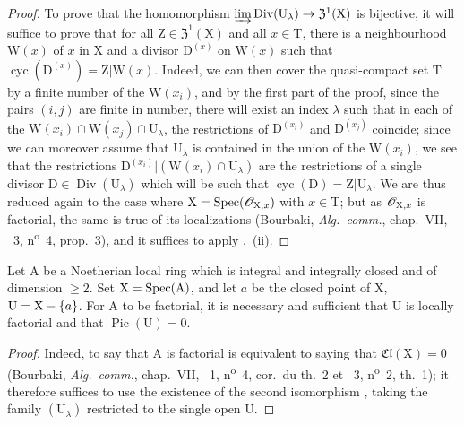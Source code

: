 \begin{proof}
To prove that the homomorphism $\varinjlim\operatorname{Div}(\mathrm{U}_\lambda)\to\mathfrak{Z}^1(\mathrm{X})$ is bijective, it will suffice to prove that for all $\mathrm{Z}\in\mathfrak{Z}^1(\mathrm{X})$ and all $x\in\mathrm{T}$, there is a neighbourhood $\mathrm{W}(x)$ of $x$ in $\mathrm{X}$ and a divisor $\mathrm{D}^{(x)}$ on $\mathrm{W}(x)$ such that $\operatorname{cyc}(\mathrm{D}^{(x)})=\mathrm{Z}|\mathrm{W}(x)$.
Indeed, we can then cover the quasi-compact set $\mathrm{T}$ by a finite number of the $\mathrm{W}(x_i)$, and by the first part of the proof, since the pairs $(i,j)$ are finite in number, there will exist an index $\lambda$ such that in each of the $\mathrm{W}(x_i)\cap\mathrm{W}(x_j)\cap\mathrm{U}_\lambda$, the restrictions of $\mathrm{D}^{(x_i)}$ and $\mathrm{D}^{(x_j)}$ coincide;
since we can moreover assume that $\mathrm{U}_\lambda$ is contained in the union of the $\mathrm{W}(x_i)$, we see that the restrictions $\mathrm{D}^{(x_i)}|(\mathrm{W}(x_i)\cap\mathrm{U}_\lambda)$ are the restrictions of a single divisor $\mathrm{D}\in\operatorname{Div}(\mathrm{U}_\lambda)$ which will be such that $\operatorname{cyc}(\mathrm{D})=\mathrm{Z}|\mathrm{U}_\lambda$.
We are thus reduced again to the case where $\mathrm{X}=\operatorname{Spec}(\mathscr{O}_{\mathrm{X},x})$ with $x\in\mathrm{T}$;
but as $\mathscr{O}_{\mathrm{X},x}$ is factorial, the same is true of its localizations (Bourbaki, \emph{Alg.\ comm.}, chap.~VII, \textsection~3, n\textsuperscript{o}~4, prop.~3), and it suffices to apply ,{}~(ii).
\end{proof}

\begin{corollary}[21.6.13]
\label{IV.21.6.13}
Let $\mathrm{A}$ be a Noetherian local ring which is integral and integrally closed and of dimension $\geq 2$.
Set $\mathrm{X}=\operatorname{Spec}(\mathrm{A})$, and let $a$ be the closed point of $\mathrm{X}$, $\mathrm{U}=\mathrm{X}-\{a\}$.
For $\mathrm{A}$ to be factorial, it is necessary and sufficient that $\mathrm{U}$ is locally factorial and that $\operatorname{Pic}(\mathrm{U})=0$.
\end{corollary}

\begin{proof}
Indeed, to say that $\mathrm{A}$ is factorial is equivalent to saying that $\mathfrak{Cl}(\mathrm{X})=0$ (Bourbaki, \emph{Alg.\ comm.}, chap.~VII, \textsection~1, n\textsuperscript{o}~4, cor.\ du th.~2 et \textsection~3, n\textsuperscript{o}~2, th.~1);
it therefore suffices to use the existence of the second isomorphism , taking the family $(\mathrm{U}_\lambda)$ restricted to the single open $\mathrm{U}$.
\end{proof}

